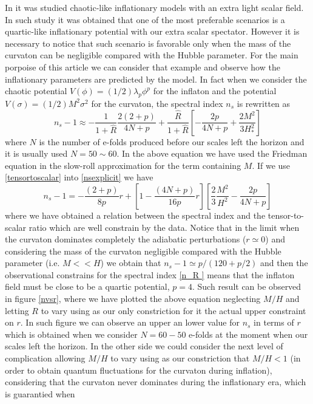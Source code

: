 \documentclass[amssymb,twocolumn,prd,nofootinbib,showpacs]{revtex4-1}
\begin{document}
In \cite{curvaton15} it was studied chaotic-like inflationary models with an extra light scalar field. In such study it was obtained that one of the most preferable scenarios is a quartic-like inflationary potential with our extra scalar spectator. However it is necessary to notice that such scenario is favorable only when the mass of the curvaton can be negligible compared with the Hubble parameter. For the main porpoise of this article we can consider that example and observe how the inflationary parameters are predicted by the model. In fact when we consider the chaotic potential $V(\phi)=(1/2)\lambda_p\phi^p$ for the inflaton and the  potential $V(\sigma)= (1/2)M^2\sigma^2$ for the curvaton, the spectral index $n_s$ is rewritten as
\begin{equation}
\label{nsexplicit}
n_s-1\approx -\frac{1}{1+\hat R}\frac{2(2+p)}{4N+p}+\frac{\hat R}{1+\hat R}\left[-\frac{2p}{4N+p}+\frac{2M^2}{3H_*^2}\right]
\end{equation}
where  $N$ is the number of e-folds produced before our scales left the horizon and it is usually used $N=50\sim 60$. In the above equation we have used the Friedman equation in the slow-roll approximation for the term containing $M$. If we use \eqref{tensortoscalar} into \eqref{nsexplicit} we have 
\begin{equation}
n_s-1=-\frac{(2+p)}{8p}r+\left[1-\frac{(4N+p)}{16p}r\right]\left[\frac{2}{3}\frac{M^2}{H^2}-\frac{2p}{4N+p}\right]
\end{equation}
where we have obtained a relation between the spectral index and the tensor-to-scalar ratio which are well constrain by the data. Notice that in the limit when the curvaton dominates completely the adiabatic perturbations ($r\simeq 0$) and considering the mass of the curvaton negligible compared with the Hubble parameter (i.e. $M<<H$) we obtain that $n_s-1\simeq p/(120+p/2)$ and then the observational constrains for the spectral index \eqref{n_R } means that the inflaton field must be close to be a quartic potential, $p=4$. Such result can be observed in figure \ref{nvsr}, where we have plotted the above equation neglecting $M/H$ and letting $R$ to vary using as our only constriction for it the actual upper constraint on $r$. In such figure we can observe an upper an lower value for $n_s$ in terms of $r$ which is obtained when we consider $N=60-50$ e-folds at the moment when our scales left the horizon. In the other side we could consider the next level of complication allowing $M/H$ to vary using as our constriction that $M/H<1$ (in order to obtain quantum fluctuations for the curvaton during inflation), considering that the curvaton never dominates during the inflationary era, which is guarantied when
\end{document}
